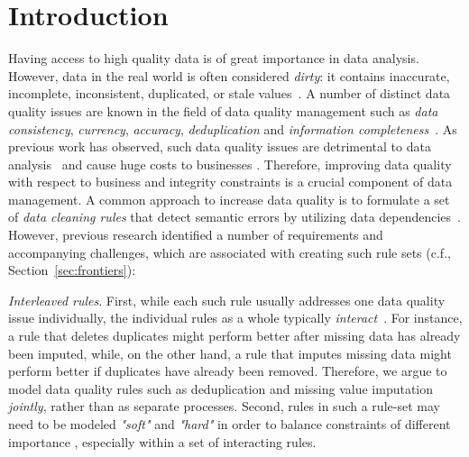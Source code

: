 \section{Introduction}
\label{sec:intro}


Having access to high quality data is of great importance in data analysis. However, data in the real world is often considered \textit{dirty}: it contains inaccurate, incomplete, inconsistent, duplicated, or stale values~\cite{chu2004blissful}. A number of distinct data quality issues are known in the field of data quality management such as \textit{data consistency}, \textit{currency}, \textit{accuracy}, \textit{deduplication} and \textit{information completeness}~\cite{fan2012foundations}. As previous work has observed, such data quality issues are detrimental to data analysis~\cite{national2013Frontiers,Fan:2008:CFD:1366102.1366103} and cause huge costs to busi\-nesses \cite{waynew.eckerson2002}. Therefore, improving data quality with respect to business and integrity constraints is a crucial component of data management. 
A common approach to increase data quality is to formulate a set of \textit{data cleaning rules} that detect semantic errors by utilizing data dependencies~\cite{fan2012foundations, Arasu:2009:LDC:1546683.1547340, Dallachiesa:2013:NCD:2463676.2465327, llunaticVDLB2013b}. However, previous research identified a number of requirements and accompanying challenges, which are associated with creating such rule sets (c.f., Section~\ref{sec:frontiers}): 

\textit{Interleaved rules}. First, while each such rule usually addresses one data quality issue individually, the individual rules as a whole typically \textit{interact}~\cite{fan2012foundations, Fan:2014:IRM:2628135.2567657}. For instance, a rule that deletes duplicates might perform better after missing data has already been imputed, while, on the other hand, a rule that imputes missing data might perform better if duplicates have already been removed. Therefore, we argue to model data quality rules such as deduplication and missing value imputation \textit{jointly}, rather than as separate processes.
Second, rules in such a rule-set may need to be modeled \textit{"soft"} and \textit{"hard"} in order to balance constraints of different importance \cite{Yakout:2013:DSU:2463676.2463706}, especially within a set of interacting rules. 

